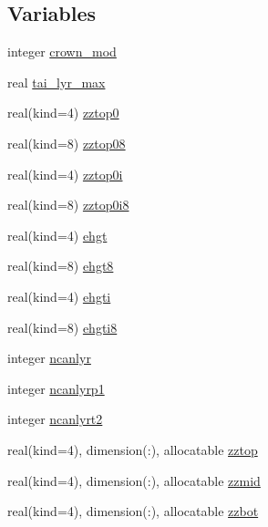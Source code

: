 \subsection*{Variables}
\begin{DoxyCompactItemize}
\item 
integer \hyperlink{namespacecanopy__layer__coms_a0a4553817f56ab7ff99a7dc9e6cec22b}{crown\+\_\+mod}
\item 
real \hyperlink{namespacecanopy__layer__coms_aba1a315d8e56fdcc8d7bfe67b7b46b50}{tai\+\_\+lyr\+\_\+max}
\item 
real(kind=4) \hyperlink{namespacecanopy__layer__coms_a4a9b49084021750115ba6985f759d65f}{zztop0}
\item 
real(kind=8) \hyperlink{namespacecanopy__layer__coms_aea39e98fc9395a5c732a1ff65490f332}{zztop08}
\item 
real(kind=4) \hyperlink{namespacecanopy__layer__coms_ab48b7d2c659df17ea27720c6864961cc}{zztop0i}
\item 
real(kind=8) \hyperlink{namespacecanopy__layer__coms_a87b13c528970235894f31da4d23f4573}{zztop0i8}
\item 
real(kind=4) \hyperlink{namespacecanopy__layer__coms_a6da88578161628f9096dbe2d61db4c3f}{ehgt}
\item 
real(kind=8) \hyperlink{namespacecanopy__layer__coms_a236bc18bf2479982046b7287875c3cb1}{ehgt8}
\item 
real(kind=4) \hyperlink{namespacecanopy__layer__coms_aab6d22966359c2d04261309e0241b5f4}{ehgti}
\item 
real(kind=8) \hyperlink{namespacecanopy__layer__coms_ab064ed626461df7d2504b5443346e926}{ehgti8}
\item 
integer \hyperlink{namespacecanopy__layer__coms_ac1e7268e66902ffe7c4c002efc1c9562}{ncanlyr}
\item 
integer \hyperlink{namespacecanopy__layer__coms_ac55175caed42184920cbf845db59561f}{ncanlyrp1}
\item 
integer \hyperlink{namespacecanopy__layer__coms_a50fbc95bdc5dacc9141c03786d3e48b7}{ncanlyrt2}
\item 
real(kind=4), dimension(\+:), allocatable \hyperlink{namespacecanopy__layer__coms_a93344c1b6866094b12e1eb38e47b5f1e}{zztop}
\item 
real(kind=4), dimension(\+:), allocatable \hyperlink{namespacecanopy__layer__coms_a708651b13f83ca19034c43fe5fef514f}{zzmid}
\item 
real(kind=4), dimension(\+:), allocatable \hyperlink{namespacecanopy__layer__coms_a4c8b994b7f3ea4ea983425f467310308}{zzbot}

\end{DoxyCompactItemize}
